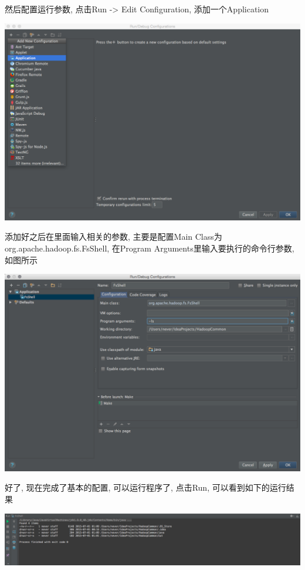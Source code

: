 然后配置运行参数, 点击Run -> Edit Configuration, 添加一个Application

\includegraphics[width=\textwidth]{image/env/cr30.png}

添加好之后在里面输入相关的参数, 主要是配置Main Class为org.apache.hadoop.fs.FsShell,
在Program Arguments里输入要执行的命令行参数, 如图所示

\includegraphics[width=\textwidth]{image/env/cr31.png}

好了, 现在完成了基本的配置, 可以运行程序了, 点击Run, 可以看到如下的运行结果

\includegraphics[width=\textwidth]{image/env/cr32.png}

